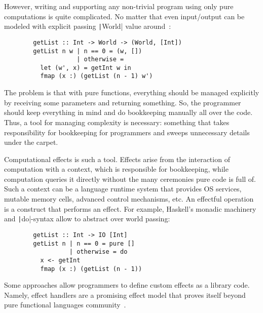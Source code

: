 \documentclass[conference]{IEEEtran}
\begin{document}
    However, writing and supporting any non-trivial program using only pure computations is quite complicated.
    No matter that even input/output can be modeled with explicit passing \texttt|World| value around~\cite{peyton1993imperative}:

    \begin{verbatim}
        getList :: Int -> World -> (World, [Int])
        getList n w | n == 0 = (w, [])
                    | otherwise =
          let (w', x) = getInt w in
          fmap (x :) (getList (n - 1) w')
    \end{verbatim}

    The problem is that with pure functions, everything should be managed explicitly by receiving some parameters and returning something.
    So, the programmer should keep everything in mind and do bookkeeping manually all over the code.
    Thus, a tool for managing complexity is necessary: something that takes responsibility for bookkeeping for programmers and sweeps unnecessary details under the carpet.

    Computational effects is such a tool.
    Effects arise from the interaction of computation with a context, which is responsible for bookkeeping, while computation queries it directly without the many ceremonies pure code is full of.
    Such a context can be a language runtime system that provides OS services, mutable memory cells, advanced control mechanisms, etc.
    An effectful operation is a construct that performs an effect.
    For example, Haskell's monadic machinery and \texttt|do|-syntax allow to abstract over world passing:

    \begin{verbatim}
        getList :: Int -> IO [Int]
        getList n | n == 0 = pure []
                  | otherwise = do
          x <- getInt
          fmap (x :) (getList (n - 1))
    \end{verbatim}

    Some approaches allow programmers to define custom effects as a library code.
    Namely, effect handlers are a promising effect model that proves itself beyond pure functional languages community~\cite{plotkin2013handling, chandrasekaran2018algebraic}.

%
\end{document}

